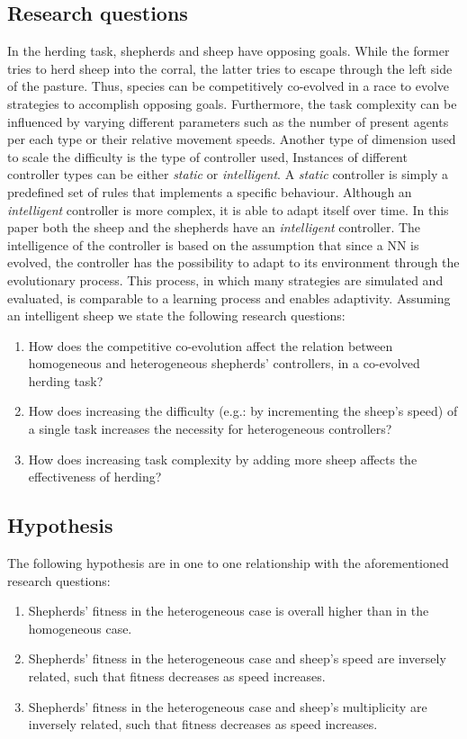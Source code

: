 \documentclass[conference]{IEEEtran}
\begin{document}
\subsection{Research questions}
In the herding task, shepherds and sheep have opposing goals.
While the former tries to herd sheep into the corral, the latter tries to escape through the left side of the pasture. 
Thus, species can be competitively co-evolved in a race to evolve strategies to accomplish opposing goals. 
Furthermore, the task complexity can be influenced by varying different parameters such as the number of present agents per each type or their relative movement speeds. 
Another type of dimension used to scale the difficulty is the type of controller used,
Instances of different controller types can be either \textit{static} or \textit{intelligent}.
A \textit{static} controller is simply a predefined set of rules that implements a specific behaviour.
Although an \textit{intelligent} controller is more complex, it is able to  adapt itself over time.
In this paper both the sheep and the shepherds have an \textit{intelligent} controller.
The intelligence of the controller is based on the assumption that since a NN is evolved, the controller has the possibility to adapt to its environment through the evolutionary process. 
This process, in which many strategies are simulated and evaluated, is comparable to a learning process and enables adaptivity. 
Assuming an intelligent sheep we state the following research questions:
 
\begin{enumerate}
	\item How does the competitive co-evolution affect the relation between homogeneous and heterogeneous shepherds' controllers, in a co-evolved herding task?
	\item How does increasing the difficulty (e.g.: by incrementing the sheep’s speed) of a single task increases the necessity for heterogeneous controllers?
	\item How does increasing task complexity by adding more sheep affects the effectiveness of herding?
\end{enumerate}

\subsection{Hypothesis}
\label{sec:hypothesis}
The following hypothesis are in one to one relationship with the aforementioned research questions:

\begin{enumerate}
	\item Shepherds' fitness in the heterogeneous case is overall higher than in the homogeneous case.
	\item Shepherds' fitness in the heterogeneous case and sheep’s speed are inversely related, such that fitness decreases as speed increases.
	\item Shepherds' fitness in the heterogeneous case and sheep’s multiplicity are inversely related, such that fitness decreases as speed increases.
\end{enumerate}
\end{document}
